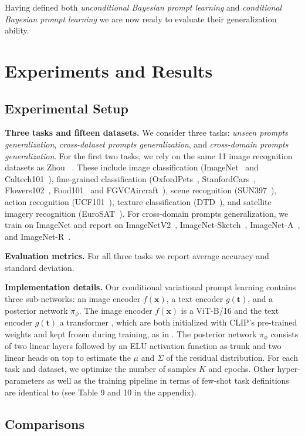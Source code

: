 \documentclass[10pt,twocolumn,letterpaper]{article}
\newcommand{\x}{\mathbf{x}}
\newcommand{\txt}{\mathbf{t}}
\begin{document}
Having defined both \textit{unconditional Bayesian prompt learning} and \textit{conditional Bayesian prompt learning} we are now ready to evaluate their generalization ability. \section{Experiments and Results}
\vspace{-0.5em}
\label{sec:experiments}

\subsection{Experimental Setup}

\textbf{Three tasks and fifteen datasets.} We consider three tasks: \textit{unseen prompts generalization}, \textit{cross-dataset prompts generalization}, and \textit{cross-domain prompts generalization}. For the first two tasks, we rely on the same 11 image recognition datasets as Zhou \etal~\cite{zhou2022learning,zhou2022conditional}. These include image classification (ImageNet~\cite{deng2009imagenet} and Caltech101~\cite{fei2004learning}), fine-grained classification  (OxfordPets~\cite{parkhi2012cats}, StanfordCars~\cite{krause20133d}, Flowers102~\cite{nilsback2008automated}, Food101~\cite{bossard2014food} and FGVCAircraft~\cite{maji2013fine}), scene recognition (SUN397~\cite{xiao2010sun}), action recognition (UCF101~\cite{soomro2012dataset}), texture classification (DTD~\cite{cimpoi2014describing}), and satellite imagery recognition (EuroSAT~\cite{helber2019eurosat}). 
For cross-domain prompts generalization, we train on  ImageNet and report on ImageNetV2~\cite{recht2019imagenet}, ImageNet-Sketch~\cite{wang2019learning}, ImageNet-A~\cite{hendrycks2021natural}, and ImageNet-R~\cite{hendrycks2021many}.

\textbf{Evaluation metrics.} For all three tasks we report average accuracy and standard deviation.

\textbf{Implementation details.}
Our conditional variational prompt learning contains three sub-networks: an image encoder $f(\x)$, a text encoder $g(\txt)$, and a posterior network $\pi_{\phi}$. The image encoder $f(\x)$ is a ViT-B/16 \cite{dosovitskiy2020image} and the text encoder $g(\txt)$ a transformer \cite{vaswani2017attention}, which are both initialized with CLIP's pre-trained weights and kept frozen during training, as in \cite{zhou2022learning, zhou2022conditional}. 
The 
posterior network
$\pi_{\phi}$ consists of two linear layers followed by an ELU activation function as trunk and two linear heads on top to estimate the $\mu$ and $\Sigma$ of the residual distribution. For each task and dataset, we optimize the number of samples $K$ and epochs. Other hyper-parameters as well as the training pipeline in terms of few-shot task definitions are identical to \cite{zhou2022learning, zhou2022conditional} (see Table 9 and 10 in the appendix).  \subsection{Comparisons}
\end{document}
